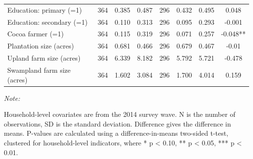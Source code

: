 \documentclass[
]{article}
\begin{document}
\begin{table}[!h]
\begin{threeparttable}
\begin{tabular}[t]{lllllllc}
\hspace{1em}Education: primary (=1) & 364 & 0.385 & 0.487 & 296 & 0.432 & 0.495 & 0.048\\
\hspace{1em}Education: secondary (=1) & 364 & 0.110 & 0.313 & 296 & 0.095 & 0.293 & -0.001\\
\hspace{1em}Cocoa farmer (=1) & 364 & 0.115 & 0.319 & 296 & 0.071 & 0.257 & -0.048**\\
\hspace{1em}Plantation size (acres) & 364 & 0.681 & 0.466 & 296 & 0.679 & 0.467 & -0.01\\
\hspace{1em}Upland farm size (acres) & 364 & 6.339 & 8.182 & 296 & 5.792 & 5.721 & -0.478\\
\hspace{1em}Swampland farm size (acres) & 364 & 1.602 & 3.084 & 296 & 1.700 & 4.014 & 0.159\\
\bottomrule
\end{tabular}
\begin{tablenotes}
\item \textit{Note: } 
\item Household-level covariates are from the 2014 survey wave. N is the number of observations, SD is the standard deviation. Difference gives the difference in means. P-values are calculated using a difference-in-means two-sided t-test, clustered for household-level indicators, where * p < 0.10, ** p < 0.05, *** p < 0.01.
\end{tablenotes}
\end{threeparttable}
\end{table}
\end{document}
